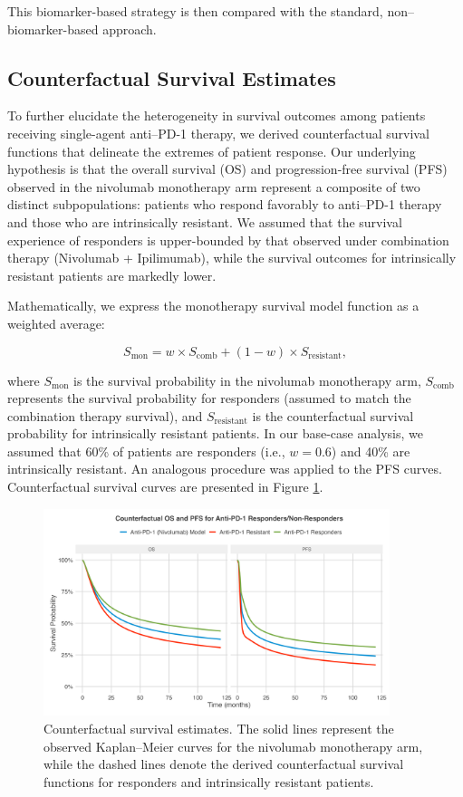 \documentclass[preprint, 3p,
authoryear]{elsarticle} %
\begin{document}
This biomarker-based strategy is then compared with the standard,
non--biomarker-based approach.

\subsection{Counterfactual Survival
Estimates}\label{counterfactual-survival-estimates}

To further elucidate the heterogeneity in survival outcomes among
patients receiving single-agent anti--PD-1 therapy, we derived
counterfactual survival functions that delineate the extremes of patient
response. Our underlying hypothesis is that the overall survival (OS)
and progression-free survival (PFS) observed in the nivolumab
monotherapy arm represent a composite of two distinct subpopulations:
patients who respond favorably to anti--PD-1 therapy and those who are
intrinsically resistant. We assumed that the survival experience of
responders is upper-bounded by that observed under combination therapy
(Nivolumab + Ipilimumab), while the survival outcomes for intrinsically
resistant patients are markedly lower.

Mathematically, we express the monotherapy survival model function as a
weighted average:

\[
S_{\text{mon}} = w \times S_{\text{comb}} + (1 - w) \times S_{\text{resistant}},
\]

where \(S_{\text{mon}}\) is the survival probability in the nivolumab
monotherapy arm, \(S_{\text{comb}}\) represents the survival probability
for responders (assumed to match the combination therapy survival), and
\(S_{\text{resistant}}\) is the counterfactual survival probability for
intrinsically resistant patients. In our base-case analysis, we assumed
that 60\% of patients are responders (i.e., \(w = 0.6\)) and 40\% are
intrinsically resistant. An analogous procedure was applied to the PFS
curves. Counterfactual survival curves are presented in Figure
\hyperref[fig:counterfactual]{\ref{fig:counterfactual}}.

\begin{figure}[h]
\centering
\includegraphics[width=0.9\textwidth]{../outputs/counterfactual_survival.png}
\caption{Counterfactual survival estimates. The solid lines represent the observed Kaplan–Meier curves for the nivolumab monotherapy arm, while the dashed lines denote the derived counterfactual survival functions for responders and intrinsically resistant patients.}
\label{fig:counterfactual}
\end{figure}
\end{document}
